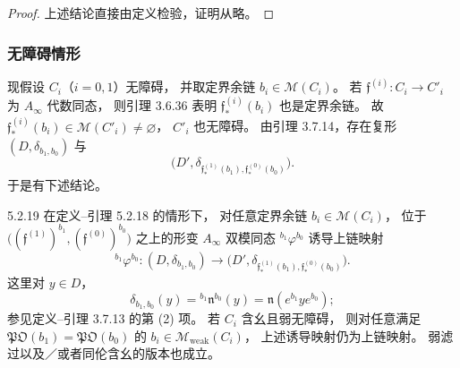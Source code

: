 \begin{proof}
上述结论直接由定义检验，证明从略。
\end{proof}

\subsubsection{无障碍情形}
\label{subsubsec:5-2-2-4}

现假设 $C_i$（$i=0,1$）无障碍，
并取定界余链 $b_i\in\mathcal M(C_i)$。
若 $\mathfrak f^{(i)}:C_i\to C'_i$
为 $A_\infty$ 代数同态，
则引理 3.6.36 表明
$\mathfrak f^{(i)}_*(b_i)$ 也是定界余链。
故 $\mathfrak f^{(i)}_*(b_i)
\in\mathcal M(C'_i)\ne\varnothing$，
$C'_i$ 也无障碍。
由引理 3.7.14，存在复形
$(D,\delta_{b_1,b_0})$ 与
\[
\bigl(D',\delta_{\mathfrak f^{(1)}_*(b_1),
\mathfrak f^{(0)}_*(b_0)}\bigr).
\]
于是有下述结论。

\begin{lemma}{5.2.19}\label{lem:5-2-19}
在定义--引理 5.2.18 的情形下，
对任意定界余链
$b_i\in\mathcal M(C_i)$，
位于
$\bigl((\mathfrak f^{(1)})^{b_1},
(\mathfrak f^{(0)})^{b_0}\bigr)$
之上的形变 $A_\infty$ 双模同态
${}^{b_1}\varphi^{b_0}$
诱导上链映射
\[
{}^{b_1}\varphi^{b_0}:
(D,\delta_{b_1,b_0})
\longrightarrow
\bigl(D',\delta_{\mathfrak f^{(1)}_*(b_1),
\mathfrak f^{(0)}_*(b_0)}\bigr).
\]
这里对 $y\in D$，
\[
\delta_{b_1,b_0}(y)
={}^{b_1}\mathfrak n^{b_0}(y)
=\mathfrak n(e^{b_1}ye^{b_0});
\]
参见定义--引理 3.7.13 的第 \textup{(2)} 项。
若 $C_i$ 含幺且弱无障碍，
则对任意满足
$\mathfrak{PO}(b_1)=\mathfrak{PO}(b_0)$
的 $b_i\in\mathcal M_{\mathrm{weak}}(C_i)$，
上述诱导映射仍为上链映射。
弱滤过以及／或者同伦含幺的版本也成立。
\end{lemma}

